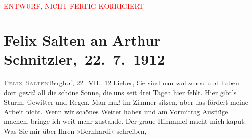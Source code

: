 
\begin{center}
            \textcolor{red}{ENTWURF, NICHT FERTIG KORRIGIERT}
                      \end{center}
            
         
         \renewcommand{\erwaehntePersonen}{Personen: Lili Cappellini, Samuel Fischer, Hedwig Fischer, Karl Goldmark, Felix Salten, Olga Schnitzler, Heinrich Schnitzler}
         \renewcommand{\erwaehnteInstitutionen}{Institutionen: K. u. k. Zensurstelle}
         \renewcommand{\erwaehnteOrte}{Orte: Berghof, Brijuni, Unterach am Attersee}
         \renewcommand{\erwaehnteWerke}{Werke: Professor Bernhardi. Komödie in fünf Akten}
               \section[ Felix Salten an Arthur Schnitzler, 22. 7. 1912]{ Felix Salten an Arthur Schnitzler, 22. 7. 1912}\nopagebreak{}\rehead{ }\begin{ledgroupsized}[t]{13cm}\normalsize\beginnumbering \toendnotes[C]{\smallbreak\pagebreak[2]} 
\toendnotes[C]{\smallbreak}\pstart
           \noindent{}{\pb}\textcolor{gray}{\textbf{\textsc{Felix Salten}}}\hfill Berghof, 22. VII. 12\pend
           \pstart{}Lieber,\pend\pstart
           Sie sind nun wol schon \label{K_L03558-1v}\label{K_L03558-1h} und haben dort gewiß all die schöne Sonne, die uns seit drei Tagen hier fehlt. Hier gibt’s Sturm,
               Gewitter und Regen. Man muß im Zimmer sitzen, aber das fördert meine Arbeit nicht.
               Wenn wir schönes Wetter haben und am Vormittag Ausflüge machen, bringe ich weit mehr
               zustande. Der graue Himmmel macht mich kaput.\pend
           \pstart
           Was Sie mir über Ihren »Bernhardi« schreiben,

\end{ledgroupsized}
